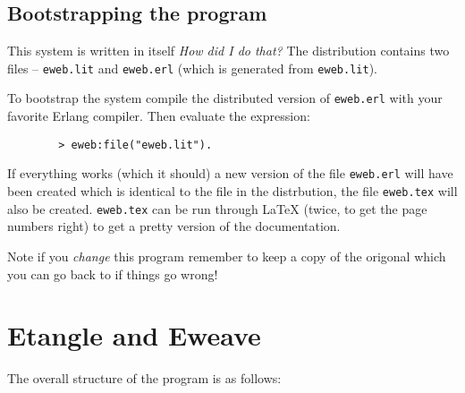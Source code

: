 \subsection*{Bootstrapping the program}

    This  system is written  in itself {\sl  How did I  do that?} The
distribution contains two files -- \verb+eweb.lit+ and \verb+eweb.erl+
(which is generated from \verb+eweb.lit+).

    To  bootstrap  the  system  compile   the distributed version   of
\verb+eweb.erl+ with your favorite  Erlang compiler. Then evaluate
the expression:

\begin{verbatim}
        > eweb:file("eweb.lit").
\end{verbatim}

  If everything works (which it should) a new version of the file
\verb+eweb.erl+ will have been created which is identical to the file in
the distrbution, the file \verb+eweb.tex+ will also be created.
\verb+eweb.tex+ can be run through \LaTeX{} (twice, to get the page
numbers right) to get a pretty version of the documentation.

    Note if you {\sl change\/} this program remember to keep a copy of
the origonal which you can go back to if things go wrong!

\section*{Etangle and Eweave}

The overall structure of the program is as follows:

